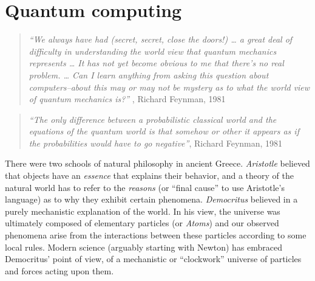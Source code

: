 \chapter{Quantum computing}\label{quantumchap}


\begin{quote}
\emph{``We always have had (secret, secret, close the doors!) \ldots{} a
great deal of difficulty in understanding the world view that quantum
mechanics represents \ldots{} It has not yet become obvious to me that
there's no real problem. \ldots{} Can I learn anything from asking this
question about computers--about this may or may not be mystery as to
what the world view of quantum mechanics is?''} , Richard Feynman, 1981
\end{quote}

\begin{quote}
\emph{``The only difference between a probabilistic classical world and
the equations of the quantum world is that somehow or other it appears
as if the probabilities would have to go negative''}, Richard Feynman,
1981
\end{quote}

There were two schools of natural philosophy in ancient Greece.
\emph{Aristotle} believed that objects have an \emph{essence} that
explains their behavior, and a theory of the natural world has to refer
to the \emph{reasons} (or ``final cause'' to use Aristotle's language)
as to why they exhibit certain phenomena. \emph{Democritus} believed in
a purely mechanistic explanation of the world. In his view, the universe
was ultimately composed of elementary particles (or \emph{Atoms}) and
our observed phenomena arise from the interactions between these
particles according to some local rules. Modern science (arguably
starting with Newton) has embraced Democritus' point of view, of a
mechanistic or ``clockwork'' universe of particles and forces acting
upon them.

